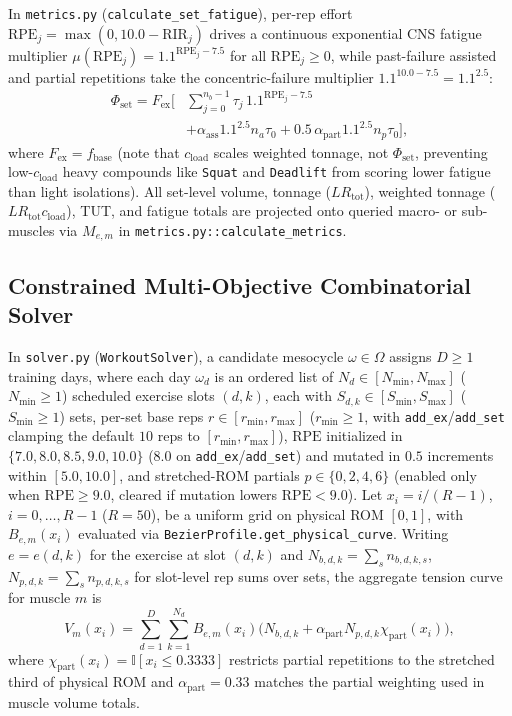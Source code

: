 \documentclass[10pt,twocolumn,letterpaper]{article}
\theoremstyle{plain}
\theoremstyle{definition}
\begin{document}
In \texttt{metrics.py} (\texttt{calculate\_set\_fatigue}), per-rep effort $\mathrm{RPE}_j = \max(0, 10.0 - \mathrm{RIR}_j)$ drives a continuous exponential CNS fatigue multiplier $\mu(\mathrm{RPE}_j) = 1.1^{\mathrm{RPE}_j - 7.5}$ for all $\mathrm{RPE}_j \ge 0$, while past-failure assisted and partial repetitions take the concentric-failure multiplier $1.1^{10.0 - 7.5} = 1.1^{2.5}$:
\begin{equation}
\begin{aligned}
  \Phi_{\mathrm{set}} = F_{\mathrm{ex}} \Biggl[ &\sum_{j=0}^{n_b-1} \tau_j \, 1.1^{\mathrm{RPE}_j - 7.5} \\
  &+ \alpha_{\mathrm{ass}} 1.1^{2.5} n_a \tau_0 + 0.5\,\alpha_{\mathrm{part}} 1.1^{2.5} n_p \tau_0 \Biggr],
\end{aligned}
\end{equation}
where $F_{\mathrm{ex}} = f_{\mathrm{base}}$ (note that $c_{\mathrm{load}}$ scales weighted tonnage, not $\Phi_{\mathrm{set}}$, preventing low-$c_{\mathrm{load}}$ heavy compounds like \texttt{Squat} and \texttt{Deadlift} from scoring lower fatigue than light isolations). All set-level volume, tonnage ($L R_{\mathrm{tot}}$), weighted tonnage ($L R_{\mathrm{tot}} c_{\mathrm{load}}$), TUT, and fatigue totals are projected onto queried macro- or sub-muscles via $M_{e,m}$ in \texttt{metrics.py::calculate\_metrics}.

\subsection{Constrained Multi-Objective Combinatorial Solver}
\label{subsec:solver}
In \texttt{solver.py} (\texttt{WorkoutSolver}), a candidate mesocycle $\omega \in \Omega$ assigns $D \ge 1$ training days, where each day $\omega_d$ is an ordered list of $N_d \in [N_{\min}, N_{\max}]$ ($N_{\min} \ge 1$) scheduled exercise slots $(d, k)$, each with $S_{d,k} \in [S_{\min}, S_{\max}]$ ($S_{\min} \ge 1$) sets, per-set base reps $r \in [r_{\min}, r_{\max}]$ ($r_{\min} \ge 1$, with \texttt{add\_ex}/\texttt{add\_set} clamping the default $10$ reps to $[r_{\min}, r_{\max}]$), $\mathrm{RPE}$ initialized in $\{7.0, 8.0, 8.5, 9.0, 10.0\}$ ($8.0$ on \texttt{add\_ex}/\texttt{add\_set}) and mutated in $0.5$ increments within $[5.0, 10.0]$, and stretched-ROM partials $p \in \{0, 2, 4, 6\}$ (enabled only when $\mathrm{RPE} \ge 9.0$, cleared if mutation lowers $\mathrm{RPE} < 9.0$). Let $x_i = i / (R - 1)$, $i = 0, \dots, R - 1$ ($R = 50$), be a uniform grid on physical ROM $[0, 1]$, with $B_{e,m}(x_i)$ evaluated via \texttt{BezierProfile.get\_physical\_curve}. Writing $e = e(d, k)$ for the exercise at slot $(d, k)$ and $N_{b,d,k} = \sum_{s} n_{b,d,k,s}$, $N_{p,d,k} = \sum_{s} n_{p,d,k,s}$ for slot-level rep sums over sets, the aggregate tension curve for muscle $m$ is
\begin{equation}
  V_m(x_i) = \sum_{d=1}^{D} \sum_{k=1}^{N_d} B_{e,m}(x_i) \bigl( N_{b,d,k} + \alpha_{\mathrm{part}} N_{p,d,k} \chi_{\mathrm{part}}(x_i) \bigr),
  \label{eq:agg_curve}
\end{equation}
where $\chi_{\mathrm{part}}(x_i) = \mathbb{I}[x_i \le 0.3333]$ restricts partial repetitions to the stretched third of physical ROM and $\alpha_{\mathrm{part}} = 0.33$ matches the partial weighting used in muscle volume totals.
\end{document}
